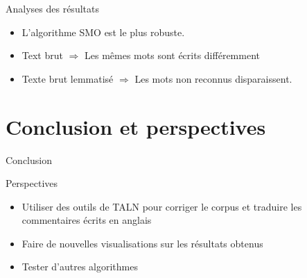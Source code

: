 \documentclass{beamer}
\begin{document}
\begin{frame}
	\begin{block}{Analyses des résultats}
	\begin{itemize}
		\item L'algorithme SMO est le plus robuste.
		\item Text brut $\Rightarrow$ Les mêmes mots sont écrits différemment
		\item Texte brut lemmatisé $\Rightarrow$ Les mots non reconnus disparaissent.
	\end{itemize}

	\end{block}
\end{frame}

\section{Conclusion et perspectives}
\begin{frame}
	\begin{block}{Conclusion}
		
	\end{block}
\end{frame}

\begin{frame}
	\begin{block}{Perspectives}
	
	\begin{itemize}
		\item Utiliser des outils de TALN pour corriger le corpus et traduire les commentaires écrits en anglais
		\item Faire de nouvelles visualisations sur les résultats obtenus
		\item Tester d'autres algorithmes
	\end{itemize}
	
	\end{block}
\end{frame}
\end{document}
